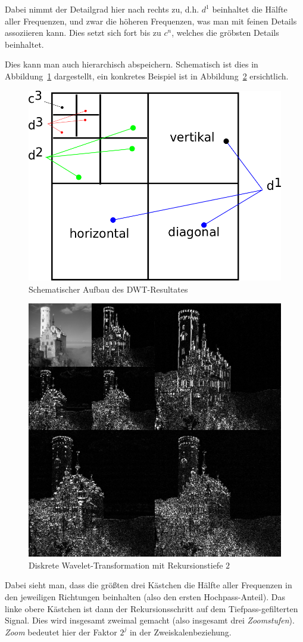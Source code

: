 \begin{description}
    Dabei nimmt der Detailgrad hier nach rechts zu, d.h. $d^1$ beinhaltet die Hälfte aller Frequenzen,
    und zwar die höheren Frequenzen, was man mit feinen Details assoziieren kann. Dies setzt sich fort
    bis zu $c^n$, welches die gröbsten Details beinhaltet.


    Dies kann man auch hierarchisch abspeichern. Schematisch ist dies in Abbildung~\ref{fig:dwtscheme} 
    dargestellt, ein konkretes Beispiel ist in Abbildung~\ref{fig:dwtlichtenstein} ersichtlich.

    \begin{figure}[!ht]
      \centering
      \includegraphics[width=.6\textwidth]{Fotos/DWT.png}
      \caption{Schematischer Aufbau des DWT-Resultates}
      \label{fig:dwtscheme}
    \end{figure}

    \begin{figure}[!ht]
      \centering
      \includegraphics[width=.6\textwidth]{Fotos/DWT_Lichtenstein.png}
      \caption{Diskrete Wavelet-Transformation mit Rekursionstiefe $2$}
      \label{fig:dwtlichtenstein}
    \end{figure}

    Dabei sieht man, dass die größten drei Kästchen die Hälfte aller Frequenzen in den jeweiligen Richtungen
    beinhalten (also den ersten Hochpass-Anteil). Das linke obere Kästchen ist dann der Rekursionsschritt
    auf dem Tiefpass-gefilterten Signal. Dies wird insgesamt zweimal gemacht (also insgesamt drei \emph{Zoomstufen}).
    \emph{Zoom} bedeutet hier der Faktor $2^j$ in der Zweiskalenbeziehung.


\end{description}
